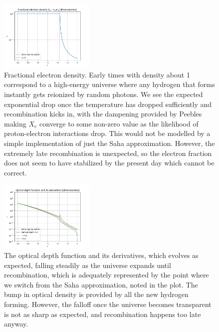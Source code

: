 \begin{figure}[h!tbp]
\centering
\includegraphics[width=0.4\textwidth]{../Milestone 2/Plots/Xe.png}
\caption{Fractional electron density. Early times with density about 1 correspond to a high-energy universe where any hydrogen that forms instantly gets reionized by random photons. We see the expected exponential drop once the temperature has dropped sufficiently and recombination kicks in, with the dampening provided by Peebles making $X_e$ converge to some non-zero value as the likelihood of proton-electron interactions drop. This would not be modelled by a simple implementation of just the Saha approximation. However, the extremely late recombination is unexpected, so the electron fraction does not seem to have stabilized by the present day which cannot be correct.}
\label{fig:milestone_2_Xe}
\end{figure}

\begin{figure}[h!tbp]
\centering
\includegraphics[width=0.4\textwidth]{../Milestone 2/Plots/tau_and_derivs.png}
\caption{The optical depth function and its derivatives, which evolves as expected, falling steadily as the universe expands until recombination, which is adequately represented by the point where we switch from the Saha approximation, noted in the plot. The bump in optical density is provided by all the new hydrogen forming. However, the falloff once the universe becomes transparent is not as sharp as expected, and recombination happens too late anyway.}
\label{fig:milestone_2_tau_and_derivs}
\end{figure}

